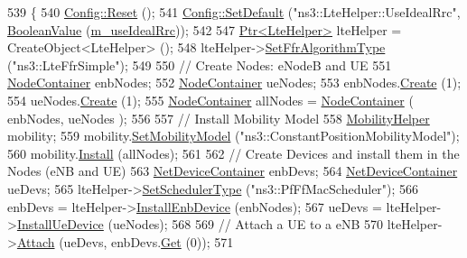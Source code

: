 \begin{DoxyCode}
539 \{
540   \hyperlink{group__config_ga2c1b65724f42f8c72276d7e7ad6df6db}{Config::Reset} ();
541   \hyperlink{group__config_ga2e7882df849d8ba4aaad31c934c40c06}{Config::SetDefault} (\textcolor{stringliteral}{"ns3::LteHelper::UseIdealRrc"}, 
      \hyperlink{classns3_1_1BooleanValue}{BooleanValue} (\hyperlink{classLteDownlinkPowerControlRrcConnectionReconfigurationTestCase_a9bd92ca03c62b95b5871c6ce5ad5beac}{m\_useIdealRrc}));
542 
547   \hyperlink{classns3_1_1Ptr}{Ptr<LteHelper>} lteHelper = CreateObject<LteHelper> ();
548   lteHelper->\hyperlink{classns3_1_1LteHelper_a035c6b03305c1511975362f80425b5fc}{SetFfrAlgorithmType} (\textcolor{stringliteral}{"ns3::LteFfrSimple"});
549 
550   \textcolor{comment}{// Create Nodes: eNodeB and UE}
551   \hyperlink{classns3_1_1NodeContainer}{NodeContainer} enbNodes;
552   \hyperlink{classns3_1_1NodeContainer}{NodeContainer} ueNodes;
553   enbNodes.\hyperlink{classns3_1_1NodeContainer_a787f059e2813e8b951cc6914d11dfe69}{Create} (1);
554   ueNodes.\hyperlink{classns3_1_1NodeContainer_a787f059e2813e8b951cc6914d11dfe69}{Create} (1);
555   \hyperlink{classns3_1_1NodeContainer}{NodeContainer} allNodes = \hyperlink{classns3_1_1NodeContainer}{NodeContainer} ( enbNodes, ueNodes );
556 
557   \textcolor{comment}{// Install Mobility Model}
558   \hyperlink{classns3_1_1MobilityHelper}{MobilityHelper} mobility;
559   mobility.\hyperlink{classns3_1_1MobilityHelper_a030275011b6f40682e70534d30280aba}{SetMobilityModel} (\textcolor{stringliteral}{"ns3::ConstantPositionMobilityModel"});
560   mobility.\hyperlink{classns3_1_1MobilityHelper_a07737960ee95c0777109cf2994dd97ae}{Install} (allNodes);
561 
562   \textcolor{comment}{// Create Devices and install them in the Nodes (eNB and UE)}
563   \hyperlink{classns3_1_1NetDeviceContainer}{NetDeviceContainer} enbDevs;
564   \hyperlink{classns3_1_1NetDeviceContainer}{NetDeviceContainer} ueDevs;
565   lteHelper->\hyperlink{classns3_1_1LteHelper_a8f86e55b8b80a81732c4b2df00fb25d5}{SetSchedulerType} (\textcolor{stringliteral}{"ns3::PfFfMacScheduler"});
566   enbDevs = lteHelper->\hyperlink{classns3_1_1LteHelper_a5e009ad35ef85f46b5a6099263f15a03}{InstallEnbDevice} (enbNodes);
567   ueDevs = lteHelper->\hyperlink{classns3_1_1LteHelper_ac9cd932d7de92811cfa953c2e3b2fc9f}{InstallUeDevice} (ueNodes);
568 
569   \textcolor{comment}{// Attach a UE to a eNB}
570   lteHelper->\hyperlink{classns3_1_1LteHelper_a9466743f826aa2652a87907b7f0a1c87}{Attach} (ueDevs, enbDevs.\hyperlink{classns3_1_1NetDeviceContainer_a677d62594b5c9d2dea155cc5045f4d0b}{Get} (0));
571 

\end{DoxyCode}
